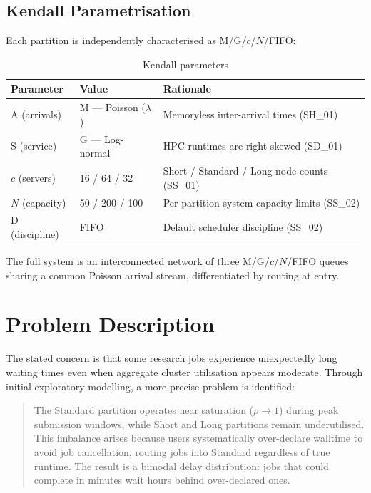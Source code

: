 \documentclass[11pt,a4paper]{article}
\newcommand{\lam}{\ensuremath{\lambda}}
\begin{document}
\subsection{Kendall Parametrisation}

Each partition is independently characterised as M/G/$c$/$N$/FIFO:

\begin{table}[H]
\centering
\caption{Kendall parameters}
\begin{tabularx}{\linewidth}{llX}
\toprule
\textbf{Parameter} & \textbf{Value} & \textbf{Rationale} \\
\midrule
A (arrivals)   & M --- Poisson ($\lam$) & Memoryless inter-arrival times (SH\_01) \\
S (service)    & G --- Log-normal       & HPC runtimes are right-skewed (SD\_01) \\
$c$ (servers)  & 16 / 64 / 32           & Short / Standard / Long node counts (SS\_01) \\
$N$ (capacity) & 50 / 200 / 100         & Per-partition system capacity limits (SS\_02) \\
D (discipline) & FIFO                   & Default scheduler discipline (SS\_02) \\
\bottomrule
\end{tabularx}
\end{table}

The full system is an interconnected network of three M/G/$c$/$N$/FIFO queues sharing a common Poisson
arrival stream, differentiated by routing at entry.

\section{Problem Description}

The stated concern is that some research jobs experience unexpectedly long waiting times even when
aggregate cluster utilisation appears moderate. Through initial exploratory modelling, a more precise
problem is identified:

\begin{quote}
The Standard partition operates near saturation ($\rho \to 1$) during peak submission windows, while
Short and Long partitions remain underutilised. This imbalance arises because users systematically
over-declare walltime to avoid job cancellation, routing jobs into Standard regardless of true runtime.
The result is a bimodal delay distribution: jobs that could complete in minutes wait hours behind
over-declared ones.
\end{quote}
\end{document}
